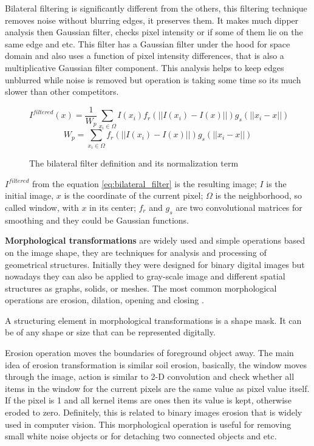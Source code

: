 \documentclass[../../../../main]{subfiles}
\begin{document}
Bilateral filtering is significantly different from the others, this filtering technique removes noise without blurring edges, it preserves them. It makes much dipper analysis then Gaussian filter, checks pixel intensity or if some of them lie on the same edge and etc. This filter has a Gaussian filter under the hood for space domain and also uses a function of pixel intensity differences, that is also a multiplicative Gaussian filter component. This analysis helps to keep edges unblurred while noise is removed but operation is taking some time so its much slower than other competitors.

\begin{figure} [!ht]
  \centering    
    \begin{equation}
    \label{eq:bilateral_filter}
        I^{filtered}(x)=\frac{1}{W_p}\sum_{x_i\in\Omega} I(x_i)f_r(||I(x_i)-I(x)||)g_s(||x_i-x||)
    \end{equation}
    \begin{equation}
       W_p=\sum_{x_i\in\Omega} f_r(||I(x_i)-I(x)||)g_s(||x_i-x||)
    \end{equation}
  \caption{The bilateral filter definition and its normalization term}
\end{figure}

$I^{filtered}$ from the equation \ref{eq:bilateral_filter} is the resulting image; $I$ is the initial image, $x$ is the coordinate of the current pixel; $\Omega$ is the neighborhood, so called window, with $x$ in its center; $f_r$ and $g_s$ are two convolutional matrices for smoothing and they could be Gaussian functions.

\textbf{Morphological transformations} are widely used and simple operations based on the image shape, they are techniques for analysis and processing of geometrical structures. Initially they were designed for binary digital images but nowadays they can also be applied to gray-scale image and different spatial structures as graphs, solids, or meshes. The most common morphological operations are erosion, dilation, opening and closing \cite{morphology_website}.

A structuring element in morphological transformations is a shape mask. It can be of any shape or size that can be represented digitally.

Erosion operation moves the boundaries of foreground object away. The main idea of erosion transformation is similar soil erosion, basically, the window moves through the image, action is similar to 2-D convolution and check whether all items in the window for the current pixels are the same value as pixel value itself. If the pixel is 1 and all kernel items are ones then its value is kept, otherwise eroded to zero. Definitely, this is related to binary images erosion that is widely used in computer vision. This morphological operation is useful for removing small white noise objects or for detaching two connected objects and etc.
\end{document}
